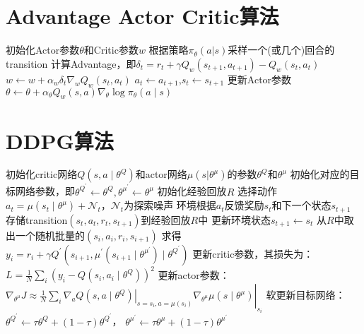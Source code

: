 \documentclass[11pt]{ctexart}
\begin{document}
\section{Advantage Actor Critic算法}
\begin{algorithm}[H] %
	\renewcommand{\thealgorithm}{} %
	\caption{} 
	\begin{algorithmic}[1] %
		\STATE 初始化Actor参数$\theta$和Critic参数$w$
			\STATE 根据策略$\pi_{\theta}(a|s)$采样一个(或几个)回合的transition
				\STATE 计算Advantage，即$ \delta_t = r_t + \gamma Q_w(s_{t+1},a_{t+1})-Q_w(s_t,a_t)$
				\STATE $w \leftarrow w+\alpha_{w} \delta_{t} \nabla_{w} Q_w(s_t,a_t)$
				\STATE $a_t \leftarrow a_{t+1}$,$s_t \leftarrow s_{t+1}$
			\ENDFOR
			\STATE 更新Actor参数$\theta \leftarrow \theta+\alpha_{\theta} Q_{w}(s, a) \nabla_{\theta} \log \pi_{\theta}(a \mid s)$
		\ENDFOR
	\end{algorithmic}
\end{algorithm}

\clearpage

\section{DDPG算法}
\begin{algorithm}[H] %
	\renewcommand{\thealgorithm}{} %
	\caption{} 
	\begin{algorithmic}[1] %
		\STATE 初始化critic网络$Q\left(s, a \mid \theta^Q\right)$和actor网络$\mu(s|\theta^{\mu})$的参数$\theta^Q$和$\theta^{\mu}$
		\STATE 初始化对应的目标网络参数，即$\theta^{Q^{\prime}} \leftarrow \theta^Q, \theta^{\mu^{\prime}} \leftarrow \theta^\mu$
		\STATE 初始化经验回放$R$
			\STATE 选择动作$a_t=\mu\left(s_t \mid \theta^\mu\right)+\mathcal{N}_t$，$\mathcal{N}_t$为探索噪声
			\STATE 环境根据$a_t$反馈奖励$s_t$和下一个状态$s_{t+1}$
			\STATE 存储transition$(s_t,a_t,r_t,s_{t+1})$到经验回放$R$中
			\STATE 更新环境状态$s_{t+1} \leftarrow s_t$
			\STATE 从$R$中取出一个随机批量的$(s_i,a_i,r_i,s_{i+1})$
			\STATE 求得$y_i=r_i+\gamma Q^{\prime}\left(s_{i+1}, \mu^{\prime}\left(s_{i+1} \mid \theta^{\mu^{\prime}}\right) \mid \theta^{Q^{\prime}}\right)$
			\STATE 更新critic参数，其损失为：$L=\frac{1}{N} \sum_i\left(y_i-Q\left(s_i, a_i \mid \theta^Q\right)\right)^2$
			\STATE 更新actor参数：$\left.\left.\nabla_{\theta^\mu} J \approx \frac{1}{N} \sum_i \nabla_a Q\left(s, a \mid \theta^Q\right)\right|_{s=s_i, a=\mu\left(s_i\right)} \nabla_{\theta^\mu} \mu\left(s \mid \theta^\mu\right)\right|_{s_i}$
			\STATE 软更新目标网络：$\theta^{Q^{\prime}} \leftarrow \tau \theta^Q+(1-\tau) \theta^{Q^{\prime}}$，
			$\theta^{\mu^{\prime}} \leftarrow \tau \theta^\mu+(1-\tau) \theta^{\mu^{\prime}}$
		\ENDFOR
	\end{algorithmic}
\end{algorithm}
\clearpage
\end{document}
